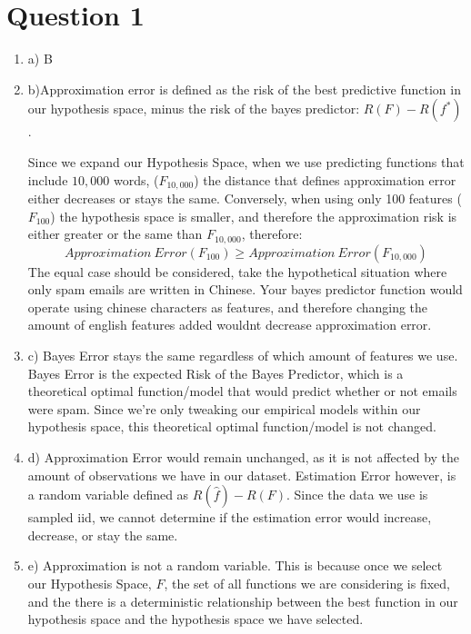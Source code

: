 \documentclass{article}
\theoremstyle{plain}
\theoremstyle{definition}
\begin{document}

\pagestyle{myheadings} 
\section{Question 1}
\begin{enumerate}
    \item a) B
    \item b)Approximation error is defined as the risk of the best predictive function in our hypothesis space, minus the risk of the bayes predictor: $R(F)-R(f^*)$. 
    
    Since we expand our Hypothesis Space, when we use predicting functions that include $10,000$ words, ($F_{10,000}$) the distance that defines approximation error either decreases or stays the same. Conversely, when using only 100 features ($F_{100}$) the hypothesis space is smaller, and therefore the approximation risk is either greater or the same than $F_{10,000}$, therefore:
    $$Approximation \ Error(F_{100})\geq Approximation \ 
    Error(F_{10,000})$$
    The equal case should be considered, take the hypothetical situation where only spam emails are written in Chinese. Your bayes predictor function would operate using chinese characters as features, and therefore changing the amount of english features added wouldnt decrease approximation error.
    
    \item c) Bayes Error stays the same regardless of which amount of features we use. Bayes Error is the expected Risk of the Bayes Predictor, which is a theoretical optimal function/model that would predict whether or not emails were spam. Since we're only tweaking our empirical models within our hypothesis space, this theoretical optimal function/model is not changed.
    \item d) Approximation Error would remain unchanged, as it is not affected by the amount of observations we have in our dataset. Estimation Error however, is a random variable defined as $R(\hat{f}) - R(F)$. Since the data we use is sampled iid, we cannot determine if the estimation error would increase, decrease, or stay the same.
    \item e) Approximation is not a random variable. This is because once we select our Hypothesis Space, $F$, the set of all functions we are considering is fixed, and the there is a deterministic relationship between the best function in our hypothesis space and the hypothesis space we have selected. 
    

\end{enumerate}
\end{document}
